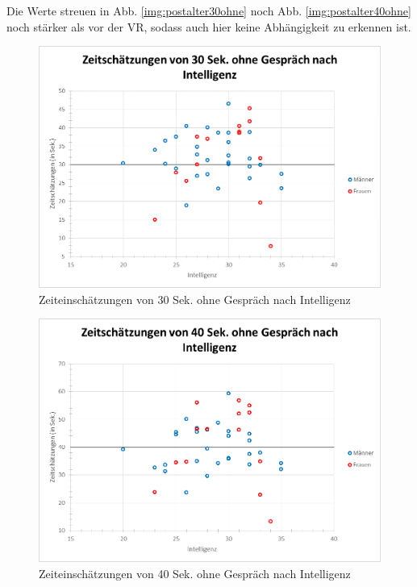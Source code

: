 \documentclass{Paper}
\begin{document}
Die Werte streuen in Abb. \ref{img:postalter30ohne} noch Abb. \ref{img:postalter40ohne} noch stärker als vor der VR, sodass auch hier keine Abhängigkeit zu erkennen ist.



\begin{figure}[H]
	\centering
	\includegraphics[scale=0.7]{../Diagramme/scatterPost/30ohne_intelligenz.png}
	\caption{Zeiteinschätzungen von 30 Sek. ohne Gespräch nach Intelligenz}
	\label{img:postintell30ohne}
\end{figure}
\begin{figure}[H]
	\centering
	\includegraphics[scale=0.7]{../Diagramme/scatterPost/40ohne_intelligenz.png}
	\caption{Zeiteinschätzungen von 40 Sek. ohne Gespräch nach Intelligenz}
	\label{img:postintell40ohne}
\end{figure}
\end{document}
